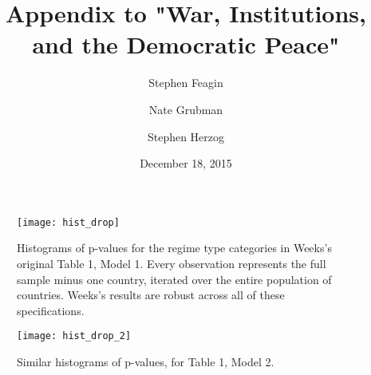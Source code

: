 \documentclass[letterpaper]{article}
\title{Appendix to "War, Institutions, and the Democratic Peace"}
\author{Stephen Feagin \and Nate Grubman \and Stephen Herzog}
\date{December 18, 2015}
\begin{document}
\maketitle





























\begin{figure}
	\texttt{[image: hist\_drop]}
	\caption{Histograms of p-values for the regime type categories in Weeks's original Table 1, Model 1. Every observation represents the full sample minus one country, iterated over the entire population of countries. Weeks's results are robust across all of these specifications.}
\end{figure}

\begin{figure}
	\texttt{[image: hist\_drop\_2]}
	\caption{Similar histograms of p-values, for Table 1, Model 2.}
\end{figure}
\end{document}
